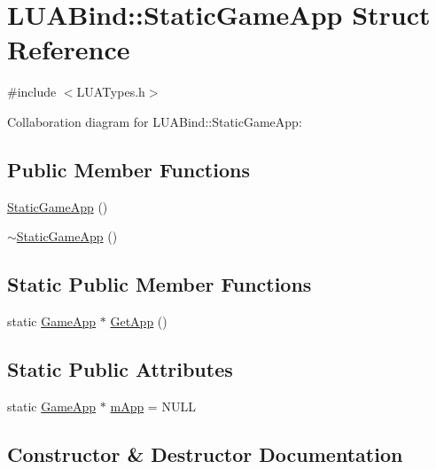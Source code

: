 \hypertarget{structLUABind_1_1StaticGameApp}{}\section{L\+U\+A\+Bind\+:\+:Static\+Game\+App Struct Reference}
\label{structLUABind_1_1StaticGameApp}


{\ttfamily \#include $<$L\+U\+A\+Types.\+h$>$}



Collaboration diagram for L\+U\+A\+Bind\+:\+:Static\+Game\+App\+:
\subsection*{Public Member Functions}
\begin{DoxyCompactItemize}
\item 
\hyperlink{structLUABind_1_1StaticGameApp_a19b7ee1794e84aff26e50a6291415d33}{Static\+Game\+App} ()
\item 
\hyperlink{structLUABind_1_1StaticGameApp_ad949f055765c78d2e2a238596bc9b703}{$\sim$\+Static\+Game\+App} ()
\end{DoxyCompactItemize}
\subsection*{Static Public Member Functions}
\begin{DoxyCompactItemize}
\item 
static \hyperlink{classGameApp}{Game\+App} $\ast$ \hyperlink{structLUABind_1_1StaticGameApp_a4eec132db797ee93e67680cf068a962d}{Get\+App} ()
\end{DoxyCompactItemize}
\subsection*{Static Public Attributes}
\begin{DoxyCompactItemize}
\item 
static \hyperlink{classGameApp}{Game\+App} $\ast$ \hyperlink{structLUABind_1_1StaticGameApp_a4cd307a6ce2d34f235389436cfddee73}{m\+App} = N\+U\+LL
\end{DoxyCompactItemize}


\subsection{Constructor \& Destructor Documentation}
